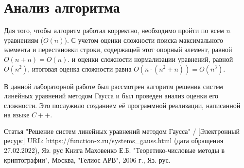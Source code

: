 \documentclass[bachelor, och, labwork]{shiza}
\begin{document}
\section{Анализ алгоритма}

  Для того, чтобы алгоритм работал корректно, необходимо пройти по всем $n$ уравнениям ($O(n)$). С учетом оценки 
  сложности поиска максимального элемента и перестановки строки, содержащей этот опорный элемент, равной $O(n+n)= O(n)$.
  и оценки сложности нормализации уравнений, равной $O(n^2)$,  итоговая оценка сложности равна $O(n \cdot (n^2 + n)) = O(n^3)$.
  
\conclusion

В данной лабораторной работе был рассмотрен алгоритм решения систем линейных уравнений методом Гаусса и был проведен анализ оценки его сложности.
Это послужило созданием её программной реализации, написанной на языке $C++$. 

\begin{thebibliography}{3}
  Статья "Решение систем линейных уравнений методом Гаусса"  / [Электронный ресурс] URL: https://function-x.ru/systems_gauss.html (дата обращения 27.02.2022), Яз. рус
  Книга Маховенко Е.Б. "Теоретико-числовые методы в криптографии", Москва, "Гелиос АРВ", 2006 г., Яз. рус.
\end{thebibliography}
\end{document}
